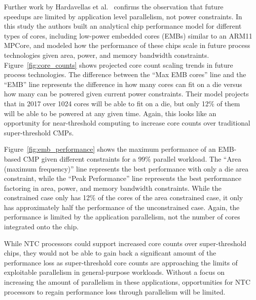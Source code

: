 Further work by Hardavellas et al.~\cite{Hardavellas:2011de} confirms the
observation that future speedups are limited by application level parallelism,
not power constraints. In this study the authors built an analytical chip performance model for
different types of cores, including low-power embedded cores (EMBs) similar to
an ARM11 MPCore, and modeled how the performance of these chips scale in future
process technologies given area,
power, and memory bandwidth constraints. Figure~\ref{fig:core_counts} shows
projected core count scaling trends in future process technologies. The
difference between the ``Max EMB cores'' line and the ``EMB'' line represents
the difference in how many cores can fit on a die versus how many can be powered
given current power constraints.  Their model projects that in 2017 over 1024
cores will be able to fit on a die, but only 12\% of them will be able to be
powered at any given time.  Again, this looks like an opportunity for
near-threshold computing to increase core counts over traditional
super-threshold CMPs.

Figure~\ref{fig:emb_performance} shows the maximum performance of an EMB-based
CMP given different constraints for a 99\% parallel workload. The ``Area
(maximum frequency)'' line represents the best performance with only a die area
constraint, while the ``Peak Performance'' line represents the best performance
factoring in area, power, and memory bandwidth constraints. While the
constrained case only has 12\% of the cores of the area constrained case, it
only has approximately half the performance of the unconstrained case. Again,
the performance is limited by the application parallelism, not the number of
cores integrated onto the chip.

While NTC processors could support increased core counts
over super-threshold chips, they would not be able to gain back a significant
amount of the performance loss as super-threshold core counts are approaching
the limits of exploitable parallelism in general-purpose workloads. Without a
focus on increasing the amount of parallelism in these applications,
opportunities for NTC processors to regain performance loss through parallelism
will be limited.

